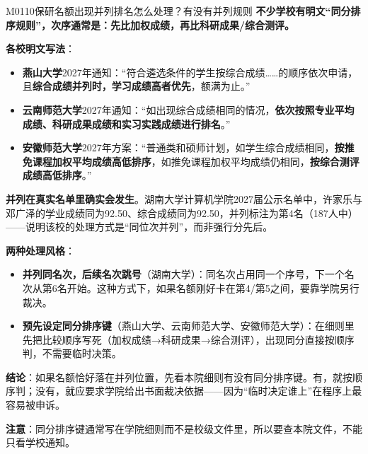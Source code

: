 \begin{qa}{M0110}{保研名额出现并列排名怎么处理？有没有并列规则}
\textbf{不少学校有明文“同分排序规则”，次序通常是：先比加权成绩，再比科研成果/综合测评。}

\textbf{各校明文写法}：

\begin{itemize}
  \item \textbf{燕山大学}2027年通知：“符合遴选条件的学生按综合成绩……的顺序依次申请，且\textbf{综合成绩并列时，学习成绩高者优先}，额满为止。”
  \item \textbf{云南师范大学}2027年通知：“如出现综合成绩相同的情况，\textbf{依次按照专业平均成绩、科研成果成绩和实习实践成绩进行排名}。”
  \item \textbf{安徽师范大学}2027年方案：“普通类和硕师计划，如学生综合成绩相同，\textbf{按推免课程加权平均成绩高低排序}，如推免课程加权平均成绩仍相同，\textbf{按综合测评成绩高低排序}。”
\end{itemize}

\textbf{并列在真实名单里确实会发生}。湖南大学计算机学院2027届公示名单中，许家乐与邓广泽的学业成绩同为92.50、综合成绩同为92.50，并列标注为第4名（187人中）——说明该校的处理方式是“同位次并列”，而非强行分先后。

\textbf{两种处理风格}：
\begin{itemize}
  \item \textbf{并列同名次，后续名次跳号}（湖南大学）：同名次占用同一个序号，下一个名次从第6名开始。这种方式下，如果名额刚好卡在第4/第5之间，要靠学院另行裁决。
  \item \textbf{预先设定同分排序键}（燕山大学、云南师范大学、安徽师范大学）：在细则里先把比较顺序写死（加权成绩→科研成果→综合测评），出现同分直接按顺序判，不需要临时决策。
\end{itemize}

\textbf{结论}：如果名额恰好落在并列位置，先看本院细则有没有同分排序键。有，就按顺序判；没有，就应要求学院给出书面裁决依据——因为“临时决定谁上”在程序上最容易被申诉。

\textbf{注意}：同分排序键通常写在学院细则而不是校级文件里，所以要查本院文件，不能只看学校通知。
\end{qa}

